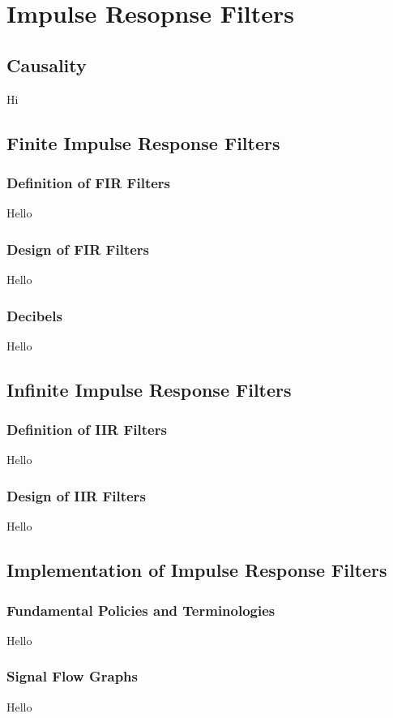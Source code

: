\chapter{Impulse Resopnse Filters}

\section{Causality}
Hi

\section{Finite Impulse Response Filters}
\subsection{Definition of FIR Filters}
Hello

\subsection{Design of FIR Filters}
Hello

\subsection{Decibels}
Hello

\section{Infinite Impulse Response Filters}
\subsection{Definition of IIR Filters}
Hello

\subsection{Design of IIR Filters}
Hello

\section{Implementation of Impulse Response Filters}
\subsection{Fundamental Policies and Terminologies}
Hello

\subsection{Signal Flow Graphs}
Hello
